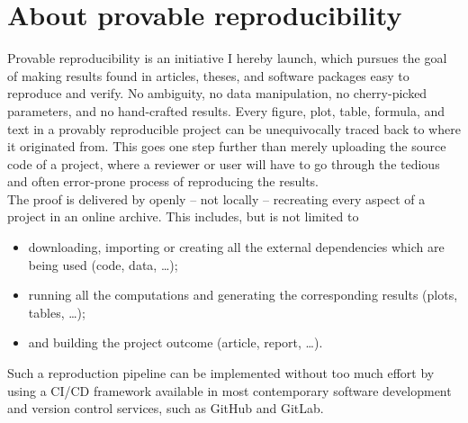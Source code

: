 \chapter*{About provable reproducibility}
\label{chp:0-reproducibility}

Provable reproducibility is an initiative I hereby launch, which pursues the
goal of making results found in articles, theses, and software packages easy to
reproduce and verify. No ambiguity, no data manipulation, no cherry-picked
parameters, and no hand-crafted results. Every figure, plot, table, formula, and
text in a provably reproducible project can be unequivocally traced back to where
it originated from. This goes one step further than merely uploading the
source code of a project, where a reviewer or user will have to go through the
tedious and often error-prone process of reproducing the results.\\

The proof is delivered by openly -- not locally -- recreating every aspect of a
project in an online archive. This includes, but is not limited to
\begin{itemize}
    \item downloading, importing or creating all the external dependencies which are being used (code, data, \dots);
    \item running all the computations and generating the corresponding results (plots, tables, \dots);
    \item and building the project outcome (article, report, \dots).
\end{itemize}
Such a reproduction pipeline can be implemented without too much effort by
using a CI/CD framework available in most contemporary software development
and version control services, such as GitHub and GitLab.

